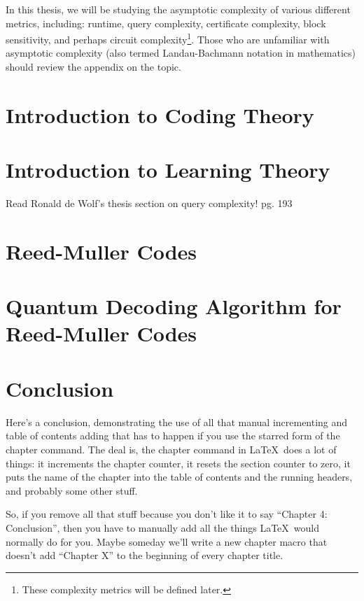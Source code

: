 \documentclass[12pt,twoside]{reedthesis}
\begin{document}
In this thesis, we will be studying the asymptotic complexity of various different metrics, including: runtime, query complexity, certificate complexity, block sensitivity, and perhaps circuit complexity\footnote{These complexity metrics will be defined later.}. Those who are unfamiliar with asymptotic complexity (also termed Landau-Bachmann notation in mathematics) should review the appendix on the topic. 


\chapter{Introduction to Coding Theory}	


\chapter{Introduction to Learning Theory}
Read Ronald de Wolf's thesis section on query complexity! pg. 193
\chapter{Reed-Muller Codes}

\chapter{Quantum Decoding Algorithm for Reed-Muller Codes}

\chapter*{Conclusion}
	\setcounter{chapter}{6}
	\setcounter{section}{0}
	
Here's a conclusion, demonstrating the use of all that manual incrementing and table of contents adding that has to happen if you use the starred form of the chapter command. The deal is, the chapter command in \LaTeX\ does a lot of things: it increments the chapter counter, it resets the section counter to zero, it puts the name of the chapter into the table of contents and the running headers, and probably some other stuff. 

So, if you remove all that stuff because you don't like it to say ``Chapter 4: Conclusion'', then you have to manually add all the things \LaTeX\ would normally do for you. Maybe someday we'll write a new chapter macro that doesn't add ``Chapter X'' to the beginning of every chapter title.
\end{document}
